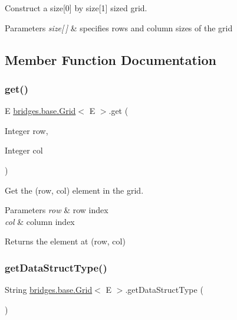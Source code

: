 Construct a size\mbox{[}0\mbox{]} by size\mbox{[}1\mbox{]} sized grid. 


\begin{DoxyParams}{Parameters}
{\em size\mbox{[}$\,$\mbox{]}} & specifies rows and column sizes of the grid \\
\hline
\end{DoxyParams}


\subsection{Member Function Documentation}
\mbox{\label{classbridges_1_1base_1_1_grid_a698579bb5b7166f76a18a1b04916e090}} 
\subsubsection{\texorpdfstring{get()}{get()}}
{\footnotesize\ttfamily E \hyperlink{classbridges_1_1base_1_1_grid}{bridges.\+base.\+Grid}$<$ E $>$.get (\begin{DoxyParamCaption}\item[{Integer}]{row,  }\item[{Integer}]{col }\end{DoxyParamCaption})}



Get the (row, col) element in the grid. 


\begin{DoxyParams}{Parameters}
{\em row} & row index \\
\hline
{\em col} & column index \\
\hline
\end{DoxyParams}
\begin{DoxyReturn}{Returns}
the element at (row, col) 
\end{DoxyReturn}
\mbox{\label{classbridges_1_1base_1_1_grid_a81f268dd27c292ff2af9358039d4ebe6}} 
\subsubsection{\texorpdfstring{get\+Data\+Struct\+Type()}{getDataStructType()}}
{\footnotesize\ttfamily String \hyperlink{classbridges_1_1base_1_1_grid}{bridges.\+base.\+Grid}$<$ E $>$.get\+Data\+Struct\+Type (\begin{DoxyParamCaption}{ }\end{DoxyParamCaption})}

